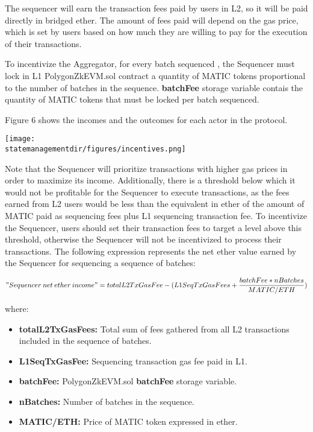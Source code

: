 The sequencer will earn the transaction fees paid by users in L2, so it will be paid directly in bridged ether. The amount of fees paid will depend on the gas price, which is set by users based on how much they are willing to pay for the execution of their transactions.


To incentivize the Aggregator, for every batch sequenced , the Sequencer must lock in L1 PolygonZkEVM.sol contract a quantity of MATIC tokens proportional to the number of batches in the sequence. \textbf{batchFee} storage variable contais the quantity of MATIC tokens that must be locked per batch sequenced.

Figure 6 shows the incomes and the outcomes for each actor in the protocol.


\begin{center}
	\texttt{[image: \\statemanagementdir/figures/incentives.png]}
\end{center}

Note that the Sequencer will prioritize transactions with higher gas prices in order to maximize its income. Additionally, there is a threshold below which it would not be profitable for the Sequencer to execute transactions, as the fees earned from L2 users would be less than the equivalent in ether of the amount of MATIC paid as sequencing fees plus L1 sequencing transaction fee. To incentivize the Sequencer, users should set their transaction fees to target a level above this threshold, otherwise the Sequencer will not be incentivized to process their transactions. The following expression represents the net ether value earned by the Sequencer for sequencing a sequence of batches:

$$"Sequencer\:net\:ether\:income" = totalL2TxGasFee - (L1SeqTxGasFees + \frac{batchFee * nBatches}{MATIC/ETH})$$

where:
\begin{itemize}
	\item \textbf{totalL2TxGasFees:} Total sum of fees gathered from all L2 transactions included in the sequence of batches.
	\item \textbf{L1SeqTxGasFee:} Sequencing transaction gas fee paid in L1.
	\item \textbf{batchFee:} PolygonZkEVM.sol \textbf{batchFee} storage variable.
	\item \textbf{nBatches:} Number of batches in the sequence.
	\item \textbf{MATIC/ETH:} Price of MATIC token expressed in ether.
\end{itemize}



